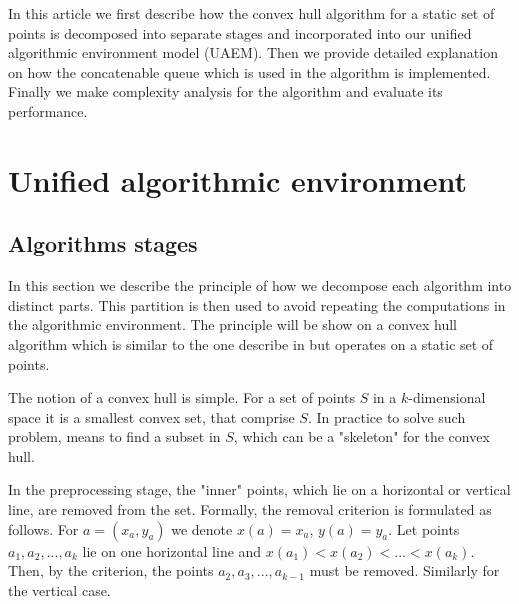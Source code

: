 \documentclass[sigconf]{acmart}
\begin{document}
	In this article we first describe how the convex hull algorithm for a static set of points is decomposed into separate stages and incorporated into our unified algorithmic environment model (UAEM). Then we provide detailed explanation on how the concatenable queue which is used in the algorithm is implemented. Finally we make complexity analysis for the algorithm and evaluate its performance.

\section{Unified algorithmic environment}
\label{sec:unified-algorithmic-environment}
\subsection{Algorithms stages}




	In this section we describe the principle of how we decompose each algorithm into distinct parts. This partition is then used to avoid repeating the computations in the algorithmic environment. The principle will be show on a convex hull algorithm which is similar to the one describe in \cite{overmars} but operates on a static set of points.

	The notion of a convex hull is simple. For a set of points $S$ in a $k$-dimensional space it is a smallest convex set, that comprise $S$. In practice to solve such problem, means to find a subset in $S$, which can be a "skeleton" for the convex hull.



		In the preprocessing stage, the "inner" points, which lie on a horizontal or vertical line, are removed from the set. Formally, the removal criterion is formulated as follows. For $a = (x_a, y_a)$ we denote $x(a)=x_a$, $y(a)=y_a$. Let points $a_1, a_2, ..., a_k$ lie on one horizontal line and $x(a_1) < x(a_2) <... <x (a_k) $. Then, by the criterion, the points $a_2, a_3, ..., a_{k-1}$ must be removed. Similarly for the vertical case.
		
\end{document}
